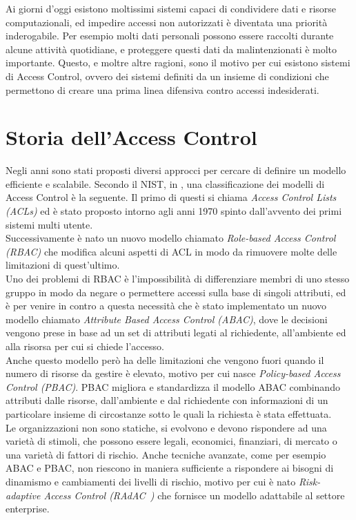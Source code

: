 \newcommand{\radac}{RAdAC\ }
\label{cap:accessControl}
Ai giorni d'oggi esistono moltissimi sistemi capaci di condividere dati e risorse computazionali, 
ed impedire accessi non autorizzati è diventata una priorità inderogabile.
Per esempio molti dati personali possono essere raccolti durante alcune attività quotidiane, e proteggere questi dati
da malintenzionati è molto importante.
Questo, e moltre altre ragioni, sono il motivo per cui esistono sistemi di Access Control, ovvero dei sistemi definiti da un insieme di condizioni 
che permettono di creare una prima linea difensiva contro accessi indesiderati.
\section{Storia dell'Access Control}
\label{sec:history}
Negli anni sono stati proposti diversi approcci per cercare di definire un modello efficiente e scalabile. Secondo il NIST, in \cite{NISTACM}, una classificazione dei modelli di Access Control è la seguente. 
Il primo di questi si chiama \textit{Access Control Lists (ACLs)} ed è stato proposto intorno agli anni 1970 spinto dall'avvento dei primi sistemi multi utente.\\
Successivamente è nato un nuovo modello chiamato \textit{Role-based Access Control (RBAC)} che modifica alcuni aspetti di ACL  in modo da rimuovere molte delle limitazioni di quest'ultimo.\\
Uno dei problemi di RBAC è l'impossibilità di differenziare membri di uno stesso gruppo in modo da negare o permettere accessi sulla base di singoli attributi, ed è per venire in contro a questa necessità che è stato implementato un nuovo modello chiamato \textit{Attribute Based Access Control (ABAC)}, dove le decisioni vengono prese in base ad un set di attributi legati al richiedente, all'ambiente ed alla risorsa per cui si chiede l'accesso.\\
Anche questo modello però ha delle limitazioni che vengono fuori quando il numero di risorse da gestire è elevato, motivo per cui nasce \textit{Policy-based Access Control (PBAC)}.
PBAC migliora e standardizza il modello ABAC combinando attributi dalle risorse, dall'ambiente e dal richiedente con informazioni di un particolare insieme di circostanze sotto le quali la richiesta è stata effettuata.\\
Le organizzazioni non sono statiche, si evolvono e devono rispondere ad una varietà di stimoli, che possono essere legali, economici, finanziari, di mercato o una varietà di fattori di rischio.
Anche tecniche avanzate, come per esempio ABAC e PBAC, non riescono in maniera sufficiente a rispondere ai bisogni di dinamismo e cambiamenti dei livelli di rischio, motivo per cui è nato \textit{Risk-adaptive Access Control (\radac)} che fornisce un modello adattabile al settore enterprise.

